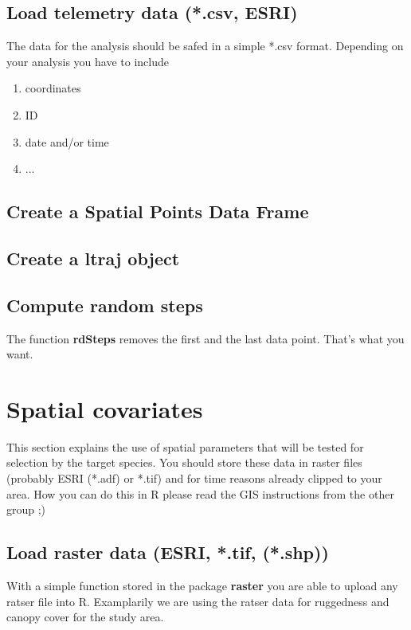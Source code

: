 \documentclass[11pt, a4paper]{article} %
\begin{document}
\subsection{Load telemetry data (*.csv, ESRI)}%
The data for the analysis should be safed in a simple *.csv format. Depending on your analysis you have to include 
\begin{enumerate}
\item{coordinates}
\item{ID}
\item{date and/or time}
\item{...}
\end{enumerate}



\subsection{Create a Spatial Points Data Frame}%

\subsection{Create a ltraj object}%
 

\subsection{Compute random steps}

The function \textbf{rdSteps} removes the first and the last data point. That's what you want. 

\section{Spatial covariates}%
This section explains the use of spatial parameters that will be tested for selection by the target species. You should store these data in raster files (probably ESRI (*.adf) or *.tif) and for time reasons already clipped to your area. How you can do this in R please read the GIS instructions from the other group ;)   

\subsection{Load raster data (ESRI, *.tif, (*.shp))}%
With a simple function stored in the package \textbf{raster} you are able to upload any ratser file into R. Examplarily we are using the ratser data for ruggedness and canopy cover for the study area.  
\end{document}
